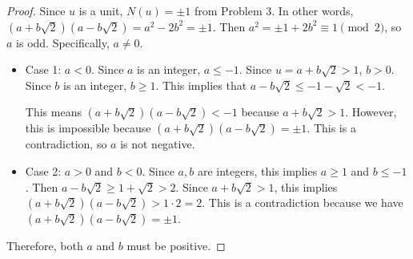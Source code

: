 \documentclass[12pt, psamsfonts]{amsart}
\theoremstyle{definition}
\theoremstyle{remark}
\numberwithin{equation}{section}
\begin{document}
\begin{proof}
  Since $u$ is a unit, $N(u) = \pm 1$ from Problem 3.
  In other words, $(a + b\sqrt{2})(a - b\sqrt{2}) = a^2 - 2b^2 = \pm 1$.
  Then $a^2 = \pm 1 + 2b^2 \equiv 1 \pmod 2$, so $a$ is odd.
  Specifically, $a \ne 0$.
  \begin{itemize}
    \item
      Case 1: $a < 0$.
      Since $a$ is an integer, $a \leq -1$.
      Since $u = a + b\sqrt{2} > 1$, $b > 0$.
      Since $b$ is an integer, $b \geq 1$.
      This implies that $a - b\sqrt{2} \leq -1 - \sqrt{2} < -1$.

      This means $(a + b\sqrt{2})(a - b\sqrt{2}) < -1$ because $a + b\sqrt{2} > 1$.
      However, this is impossible because $(a + b\sqrt{2})(a - b\sqrt{2}) = \pm 1$.
      This is a contradiction, so $a$ is not negative.
    \item
      Case 2: $a > 0$ and $b < 0$.
      Since $a, b$ are integers, this implies $a \geq 1$ and $b \leq -1$.
      Then $a - b\sqrt{2} \geq 1 + \sqrt{2} > 2$.
      Since $a + b\sqrt{2} > 1$, this implies $(a + b\sqrt{2})(a - b\sqrt{2}) > 1 \cdot 2 = 2$.
      This is a contradiction because we have $(a + b\sqrt{2})(a - b\sqrt{2}) = \pm 1$.
  \end{itemize}
  Therefore, both $a$ and $b$ must be positive.
\end{proof}
\end{document}

